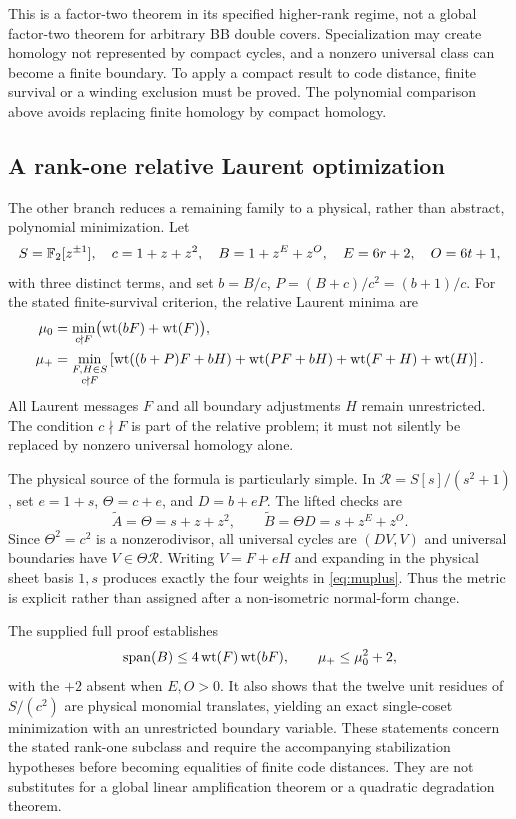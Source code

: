 This is a factor-two theorem in its specified higher-rank regime, not a global factor-two theorem for arbitrary BB double covers. Specialization may create homology not represented by compact cycles, and a nonzero universal class can become a finite boundary. To apply a compact result to code distance, finite survival or a winding exclusion must be proved. The polynomial comparison above avoids replacing finite homology by compact homology.

\subsection{A rank-one relative Laurent optimization}
The other branch reduces a remaining family to a physical, rather than abstract, polynomial minimization. Let
\[
 S=\mathbb F_2[z^{\pm1}],\quad c=1+z+z^2,\quad
 B=1+z^E+z^O,
 \quad E=6r+2,\quad O=6t+1,
\]
with three distinct terms, and set $b=B/c$, $P=(B+c)/c^2=(b+1)/c$. For the stated finite-survival criterion, the relative Laurent minima are
\begin{align}
 \mu_0&=\min_{c\nmid F}\bigl(\operatorname{wt}(bF)+\operatorname{wt}(F)\bigr),\label{eq:mu0}\\
 \mu_+&=\min_{\substack{F,H\in S\\c\nmid F}}
 \left[\operatorname{wt}((b+P)F+bH)+\operatorname{wt}(PF+bH)+\operatorname{wt}(F+H)+\operatorname{wt}(H)\right].
 \label{eq:muplus}
\end{align}
All Laurent messages $F$ and all boundary adjustments $H$ remain unrestricted. The condition $c\nmid F$ is part of the relative problem; it must not silently be replaced by nonzero universal homology alone.

The physical source of the formula is particularly simple. In $\mathcal R=S[s]/(s^2+1)$, set $e=1+s$, $\Theta=c+e$, and $D=b+eP$. The lifted checks are
\[
 \widetilde A=\Theta=s+z+z^2,\qquad
 \widetilde B=\Theta D=s+z^E+z^O.
\]
Since $\Theta^2=c^2$ is a nonzerodivisor, all universal cycles are $(DV,V)$ and universal boundaries have $V\in\Theta\mathcal R$. Writing $V=F+eH$ and expanding in the physical sheet basis $1,s$ produces exactly the four weights in \eqref{eq:muplus}. Thus the metric is explicit rather than assigned after a non-isometric normal-form change.

The supplied full proof \cite{LaurentNote} establishes
\begin{equation}\label{eq:laurentquadratic}
 \operatorname{span}(B)\le4\operatorname{wt}(F)\operatorname{wt}(bF),\qquad
 \mu_+\le\mu_0^2+2,
\end{equation}
with the $+2$ absent when $E,O>0$. It also shows that the twelve unit residues of $S/(c^2)$ are physical monomial translates, yielding an exact single-coset minimization with an unrestricted boundary variable. These statements concern the stated rank-one subclass and require the accompanying stabilization hypotheses before becoming equalities of finite code distances. They are not substitutes for a global linear amplification theorem or a quadratic degradation theorem.


